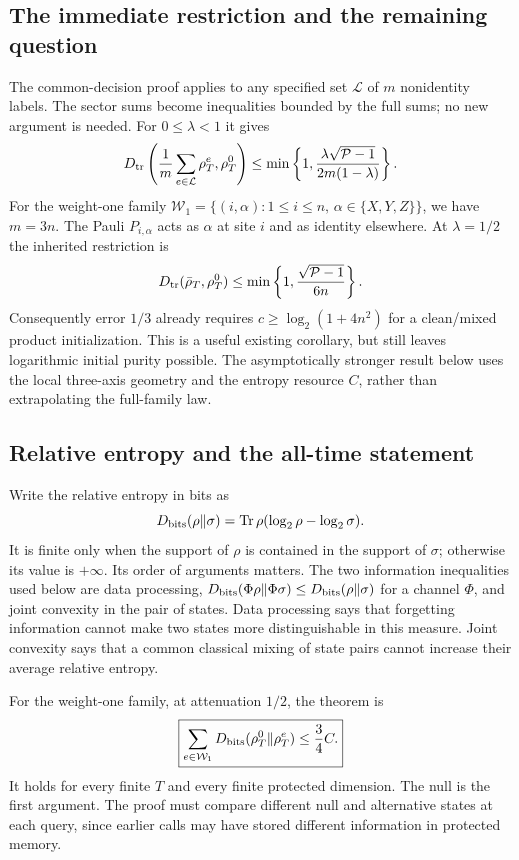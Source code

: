 \documentclass[11pt,a4paper]{article}
\numberwithin{equation}{section}
\theoremstyle{definition}
\theoremstyle{remark}
\DeclareMathOperator{\Tr}{Tr}
\begin{document}
\subsection{The immediate restriction and the remaining question}

The common-decision proof applies to any specified set $\mathcal L$ of $m$
nonidentity labels. The sector sums become inequalities bounded by the
full sums; no new argument is needed. For $0\leq\lambda<1$ it gives
\[
 D_{\rm tr}\left(\frac1m\sum_{e\in\mathcal L}\rho_T^e,\rho_T^0\right)
 \leq\min\left\{1,
       \frac{\lambda\sqrt{\mathcal P-1}}{2m(1-\lambda)}\right\}.
\]
For the weight-one family
$\mathcal W_1=\{(i,\alpha):1\leq i\leq n,\,
\alpha\in\{X,Y,Z\}\}$, we have $m=3n$.
The Pauli $P_{i,\alpha}$ acts as $\alpha$ at site $i$ and as identity elsewhere.
At $\lambda=1/2$ the inherited restriction is
\begin{equation}
 D_{\rm tr}(\bar\rho_T,\rho_T^0)
 \leq\min\left\{1,\frac{\sqrt{\mathcal P-1}}{6n}\right\}.
 \label{q:restricted-collision}
\end{equation}
Consequently error $1/3$ already requires
$c\geq\log_2(1+4n^2)$ for a clean/mixed product initialization.
This is a useful existing corollary, but still leaves logarithmic initial
purity possible. The asymptotically stronger result below uses the local three-axis geometry
and the entropy resource $C$, rather than extrapolating the full-family law.

\subsection{Relative entropy and the all-time statement}

Write the relative entropy in bits as
\[
 D_{\rm bits}(\rho\Vert\sigma)
   =\Tr\rho(\log_2\rho-\log_2\sigma).
\]
It is finite only when the support of $\rho$ is contained in the support of
$\sigma$; otherwise its value is $+\infty$. Its order of arguments matters.
The two information inequalities used below are data processing,
$D_{\rm bits}(\Phi\rho\Vert\Phi\sigma)\leq
D_{\rm bits}(\rho\Vert\sigma)$ for a channel $\Phi$, and joint convexity in
the pair of states. Data processing says that forgetting information cannot
make two states more distinguishable in this measure. Joint convexity says
that a common classical mixing of state pairs cannot increase their average
relative entropy.

For the weight-one family, at attenuation $1/2$, the theorem is
\begin{equation}
 \boxed{\sum_{e\in\mathcal W_1}
 D_{\rm bits}(\rho_T^0\Vert\rho_T^e)\leq\frac34 C.}
 \label{q:entropy-theorem}
\end{equation}
It holds for every finite $T$ and every finite protected dimension. The null
is the first argument. The proof must compare different null and alternative
states at each query, since earlier calls may have stored different information
in protected memory.
\end{document}
